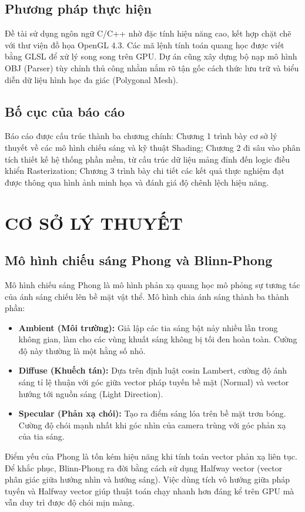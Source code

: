 \documentclass[13pt, a4paper]{extarticle}
\begin{document}
\subsection*{Phương pháp thực hiện}
Đề tài sử dụng ngôn ngữ C/C++ nhờ đặc tính hiệu năng cao, kết hợp chặt chẽ với thư viện đồ họa OpenGL 4.3. Các mã lệnh tính toán quang học được viết bằng GLSL để xử lý song song trên GPU. Dự án cũng xây dựng bộ nạp mô hình OBJ (Parser) tùy chỉnh thủ công nhằm nắm rõ tận gốc cách thức lưu trữ và biểu diễn dữ liệu hình học đa giác (Polygonal Mesh).

\subsection*{Bố cục của báo cáo}
Báo cáo được cấu trúc thành ba chương chính: 
Chương 1 trình bày cơ sở lý thuyết về các mô hình chiếu sáng và kỹ thuật Shading; 
Chương 2 đi sâu vào phân tích thiết kế hệ thống phần mềm, từ cấu trúc dữ liệu mảng đỉnh đến logic điều khiển Rasterization; 
Chương 3 trình bày chi tiết các kết quả thực nghiệm đạt được thông qua hình ảnh minh họa và đánh giá độ chênh lệch hiệu năng.

\newpage
\section{CƠ SỞ LÝ THUYẾT}

\subsection{Mô hình chiếu sáng Phong và Blinn-Phong}
Mô hình chiếu sáng Phong là mô hình phản xạ quang học mô phỏng sự tương tác của ánh sáng chiếu lên bề mặt vật thể. Mô hình chia ánh sáng thành ba thành phần:
\begin{itemize}
    \item \textbf{Ambient (Môi trường):} Giả lập các tia sáng bật nảy nhiều lần trong không gian, làm cho các vùng khuất sáng không bị tối đen hoàn toàn. Cường độ này thường là một hằng số nhỏ.
    \item \textbf{Diffuse (Khuếch tán):} Dựa trên định luật cosin Lambert, cường độ ánh sáng tỉ lệ thuận với góc giữa vector pháp tuyến bề mặt (Normal) và vector hướng tới nguồn sáng (Light Direction).
    \item \textbf{Specular (Phản xạ chói):} Tạo ra điểm sáng lóa trên bề mặt trơn bóng. Cường độ chói mạnh nhất khi góc nhìn của camera trùng với góc phản xạ của tia sáng.
\end{itemize}
Điểm yếu của Phong là tốn kém hiệu năng khi tính toán vector phản xạ liên tục. Để khắc phục, Blinn-Phong ra đời bằng cách sử dụng Halfway vector (vector phân giác giữa hướng nhìn và hướng sáng). Việc dùng tích vô hướng giữa pháp tuyến và Halfway vector giúp thuật toán chạy nhanh hơn đáng kể trên GPU mà vẫn duy trì được độ chói mịn màng.
\end{document}
